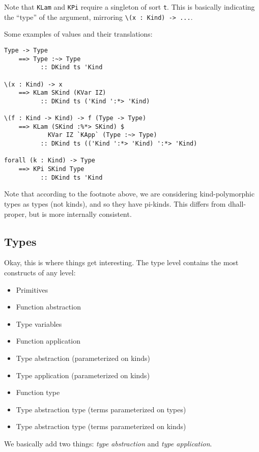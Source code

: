 \documentclass[]{article}
\begin{document}
Note that \texttt{KLam} and \texttt{KPi} require a singleton of sort \texttt{t}.
This is basically indicating the ``type'' of the argument, mirroring
\texttt{\textbackslash{}(x\ :\ Kind)\ -\textgreater{}\ ...}.

Some examples of values and their translations:

\begin{verbatim}
Type -> Type
    ==> Type :~> Type
          :: DKind ts 'Kind

\(x : Kind) -> x
    ==> KLam SKind (KVar IZ)
          :: DKind ts ('Kind ':*> 'Kind)

\(f : Kind -> Kind) -> f (Type -> Type)
    ==> KLam (SKind :%*> SKind) $
            KVar IZ `KApp` (Type :~> Type)
          :: DKind ts (('Kind ':*> 'Kind) ':*> 'Kind)

forall (k : Kind) -> Type
    ==> KPi SKind Type
          :: DKind ts 'Kind
\end{verbatim}

Note that according to the footnote above, we are considering kind-polymorphic
types as types (not kinds), and so they have pi-kinds. This differs from
dhall-proper, but is more internally consistent.

\subsection{Types}\label{types}

Okay, this is where things get interesting. The type level contains the most
constructs of any level:

\begin{itemize}
\tightlist
\item
  Primitives
\item
  Function abstraction
\item
  Type variables
\item
  Function application
\item
  Type abstraction (parameterized on kinds)
\item
  Type application (parameterized on kinds)
\item
  Function type
\item
  Type abstraction type (terms parameterized on types)
\item
  Type abstraction type (terms parameterized on kinds)
\end{itemize}

We basically add two things: \emph{type abstraction} and \emph{type
application}.
\end{document}

